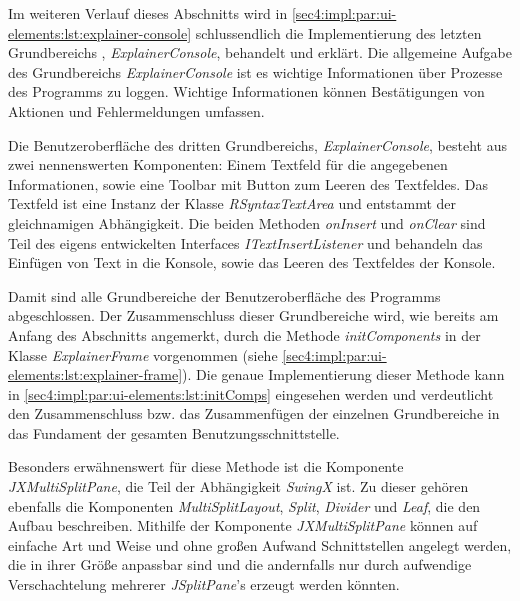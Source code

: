 \FloatBarrier

Im weiteren Verlauf dieses Abschnitts wird in \cref{sec4:impl:par:ui-elements:lst:explainer-console} schlussendlich die Implementierung des letzten Grundbereichs , \textit{ExplainerConsole}, behandelt und erklärt.
Die allgemeine Aufgabe des Grundbereichs \textit{ExplainerConsole} ist es wichtige Informationen über Prozesse des Programms zu loggen.
Wichtige Informationen können Bestätigungen von Aktionen und Fehlermeldungen umfassen.



Die Benutzeroberfläche des dritten Grundbereichs, \textit{ExplainerConsole}, besteht aus zwei nennenswerten Komponenten: Einem Textfeld für die angegebenen Informationen, sowie eine Toolbar mit Button zum Leeren des Textfeldes.
Das Textfeld ist eine Instanz der Klasse \textit{RSyntaxTextArea} und entstammt der gleichnamigen Abhängigkeit.
Die beiden Methoden \textit{onInsert} und \textit{onClear} sind Teil des eigens entwickelten Interfaces \textit{ITextInsertListener} und behandeln das Einfügen von Text in die Konsole, sowie das Leeren des Textfeldes der Konsole.

Damit sind alle Grundbereiche der Benutzeroberfläche des Programms abgeschlossen.
Der Zusammenschluss dieser Grundbereiche wird, wie bereits am Anfang des Abschnitts angemerkt, durch die Methode \textit{initComponents} in der Klasse \textit{ExplainerFrame} vorgenommen (siehe \cref{sec4:impl:par:ui-elements:lst:explainer-frame}).
Die genaue Implementierung dieser Methode kann in \cref{sec4:impl:par:ui-elements:lst:initComps} eingesehen werden und verdeutlicht den Zusammenschluss bzw. das Zusammenfügen der einzelnen Grundbereiche in das Fundament der gesamten Benutzungsschnittstelle.



Besonders erwähnenswert für diese Methode ist die Komponente \textit{JXMultiSplitPane}, die Teil der Abhängigkeit \textit{SwingX} ist.
Zu dieser gehören ebenfalls die Komponenten \textit{MultiSplitLayout}, \textit{Split}, \textit{Divider} und \textit{Leaf}, die den Aufbau beschreiben.
Mithilfe der Komponente \textit{JXMultiSplitPane} können auf einfache Art und Weise und ohne großen Aufwand Schnittstellen angelegt werden, die in ihrer Größe anpassbar sind und die andernfalls nur durch aufwendige Verschachtelung mehrerer \textit{JSplitPane}'s erzeugt werden könnten.

